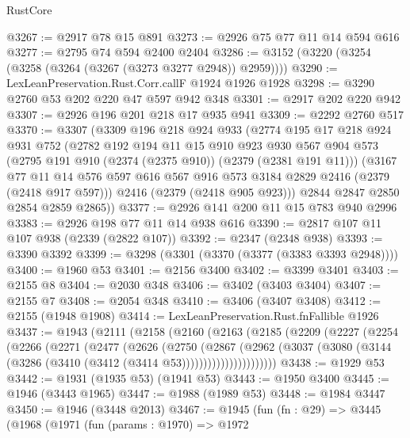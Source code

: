 \begin{lexlean}{RustCore}
\begin{coremodule}
@3267 := @2917 @78 @15 @891
@3273 := @2926 @75 @77 @11 @14 @594 @616
@3277 := @2795 @74 @594 @2400 @2404
@3286 := @3152 (@3220 (@3254 (@3258 (@3264 (@3267 (@3273 @3277 @2948)) @2959))))
@3290 := LexLeanPreservation.Rust.Corr.callF @1924 @1926 @1928
@3298 := @3290 @2760 @53 @202 @220 @47 @597 @942 @348
@3301 := @2917 @202 @220 @942
@3307 := @2926 @196 @201 @218 @17 @935 @941
@3309 := @2292 @2760 @517
@3370 := @3307
    (@3309
      @196
      @218
      @924
      @933
      (@2774
        @195
        @17
        @218
        @924
        @931
        @752
        (@2782
          @192
          @194
          @11
          @15
          @910
          @923
          @930
          @567
          @904
          @573
          (@2795 @191 @910 (@2374 (@2375 @910)) (@2379 (@2381 @191 @11)))
          (@3167
            @77
            @11
            @14
            @576
            @597
            @616
            @567
            @916
            @573
            @3184
            @2829
            @2416
            (@2379 (@2418 @917 @597)))
          @2416
          (@2379 (@2418 @905 @923)))
        @2844
        @2847
        @2850
        @2854
        @2859
        @2865))
@3377 := @2926 @141 @200 @11 @15 @783 @940 @2996
@3383 := @2926 @198 @77 @11 @14 @938 @616
@3390 := @2817 @107 @11 @107 @938 (@2339 (@2822 @107))
@3392 := @2347 (@2348 @938)
@3393 := @3390 @3392
@3399 := @3298 (@3301 (@3370 (@3377 (@3383 @3393 @2948))))
@3400 := @1960 @53
@3401 := @2156 @3400
@3402 := @3399 @3401
@3403 := @2155 @8
@3404 := @2030 @348
@3406 := @3402 (@3403 @3404)
@3407 := @2155 @7
@3408 := @2054 @348
@3410 := @3406 (@3407 @3408)
@3412 := @2155 (@1948 @1908)
@3414 := LexLeanPreservation.Rust.fnFallible @1926
@3437 := @1943
    (@2111
      (@2158
        (@2160
          (@2163
            (@2185
              (@2209
                (@2227
                  (@2254
                    (@2266
                      (@2271
                        (@2477
                          (@2626
                            (@2750
                              (@2867
                                (@2962
                                  (@3037
                                    (@3080
                                      (@3144 (@3286 (@3410 (@3412 (@3414 @53))))))))))))))))))))))
@3438 := @1929 @53
@3442 := @1931 (@1935 @53) (@1941 @53)
@3443 := @1950 @3400
@3445 := @1946 (@3443 @1965)
@3447 := @1988 (@1989 @53)
@3448 := @1984 @3447
@3450 := @1946 (@3448 @2013)
@3467 := @1945
    (fun (fn : @29) =>
    @3445
      (@1968
        (@1971
          (fun (params : @1970) =>
          @1972

\end{coremodule}
\end{lexlean}
